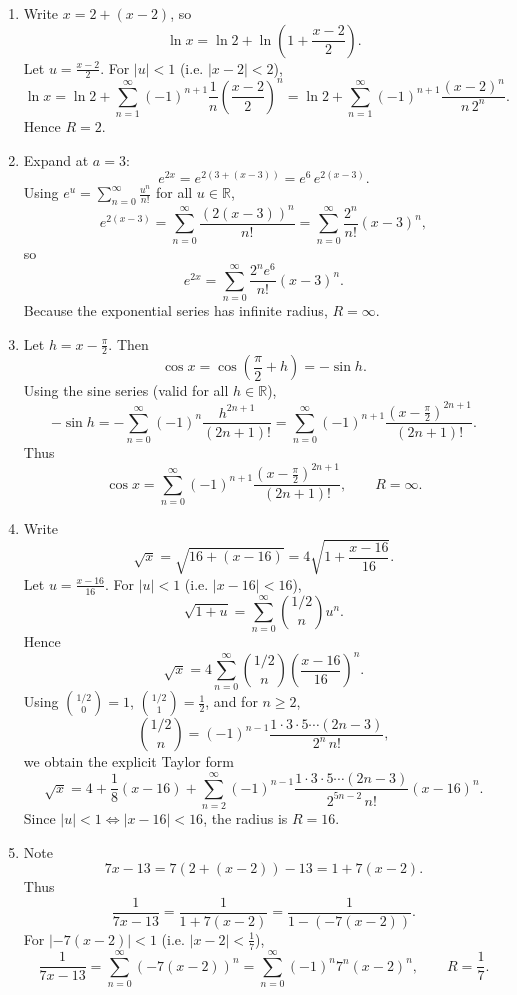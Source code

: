 \documentclass[12pt]{article}
\newcommand{\R}{\mathbb{R}}
\begin{document}
\begin{enumerate}[label=(\alph*)]
\item Write \(x=2+(x-2)\), so
\[
\ln x=\ln 2+\ln\!\left(1+\frac{x-2}{2}\right).
\]
Let \(u=\frac{x-2}{2}\). For \(|u|<1\) (i.e. \(|x-2|<2\)),
\[
\ln x=\ln 2+\sum_{n=1}^{\infty}(-1)^{n+1}\frac{1}{n}\left(\frac{x-2}{2}\right)^n
=\boxed{\ln 2+\sum_{n=1}^{\infty}(-1)^{n+1}\frac{(x-2)^n}{n\,2^n}}.
\]
Hence \(\boxed{R=2}\).

\item Expand at \(a=3\):
\[
e^{2x}=e^{2(3+(x-3))}=e^{6}\,e^{2(x-3)}.
\]
Using \(e^{u}=\sum_{n=0}^\infty \frac{u^n}{n!}\) for all \(u\in\R\),
\[
e^{2(x-3)}=\sum_{n=0}^\infty \frac{(2(x-3))^n}{n!}
=\sum_{n=0}^\infty \frac{2^n}{n!}(x-3)^n,
\]
so
\[
\boxed{e^{2x}=\sum_{n=0}^{\infty}\frac{2^n e^{6}}{n!}(x-3)^n.}
\]
Because the exponential series has infinite radius, \(\boxed{R=\infty}\).

\item Let \(h=x-\frac{\pi}{2}\). Then
\[
\cos x=\cos\!\left(\frac{\pi}{2}+h\right)=-\sin h.
\]
Using the sine series (valid for all \(h\in\R\)),
\[
-\sin h=-\sum_{n=0}^\infty (-1)^n\frac{h^{2n+1}}{(2n+1)!}
=\sum_{n=0}^\infty (-1)^{n+1}\frac{(x-\frac{\pi}{2})^{2n+1}}{(2n+1)!}.
\]
Thus
\[
\boxed{\cos x=\sum_{n=0}^{\infty}(-1)^{n+1}\frac{\left(x-\frac{\pi}{2}\right)^{2n+1}}{(2n+1)!}},
\qquad
\boxed{R=\infty}.
\]

\item Write
\[
\sqrt{x}=\sqrt{16+(x-16)}=4\sqrt{1+\frac{x-16}{16}}.
\]
Let \(u=\frac{x-16}{16}\). For \(|u|<1\) (i.e. \(|x-16|<16\)),
\[
\sqrt{1+u}=\sum_{n=0}^\infty \binom{1/2}{n}u^n.
\]
Hence
\[
\sqrt{x}=4\sum_{n=0}^\infty \binom{1/2}{n}\left(\frac{x-16}{16}\right)^n.
\]
Using \(\binom{1/2}{0}=1\), \(\binom{1/2}{1}=\frac12\), and for \(n\ge 2\),
\[
\binom{1/2}{n}=(-1)^{n-1}\frac{1\cdot 3\cdot 5\cdots (2n-3)}{2^n\,n!},
\]
we obtain the explicit Taylor form
\[
\boxed{\sqrt{x}=4+\frac18(x-16)+\sum_{n=2}^{\infty}(-1)^{n-1}\frac{1\cdot 3\cdot 5\cdots (2n-3)}{2^{5n-2}\,n!}(x-16)^n}.
\]
Since \(|u|<1\iff |x-16|<16\), the radius is \(\boxed{R=16}\).

\item Note
\[
7x-13=7(2+(x-2))-13=1+7(x-2).
\]
Thus
\[
\frac{1}{7x-13}=\frac{1}{1+7(x-2)}=\frac{1}{1-(-7(x-2))}.
\]
For \(|-7(x-2)|<1\) (i.e. \(|x-2|<\frac17\)),
\[
\frac{1}{7x-13}=\sum_{n=0}^\infty (-7(x-2))^n
=\boxed{\sum_{n=0}^\infty (-1)^n 7^n (x-2)^n},
\qquad
\boxed{R=\frac17}.
\]
\end{enumerate}
\end{document}
